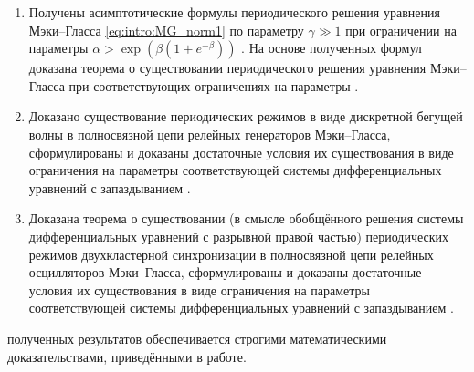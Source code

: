 \bigskip

{}
\begin{enumerate}[beginpenalty=10000] %
	\item Получены асимптотические формулы периодического решения уравнения Мэки--Гласса \eqref{eq:intro:MG_norm1} по параметру $\gamma \gg 1$ при ограничении на параметры $\alpha > \exp\left(\beta(1 + e^{-\beta})\right)$ \cite[Теорема 5.6]{wosbib1}. На основе полученных формул доказана теорема о существовании периодического решения уравнения Мэки--Гласса при соответствующих ограничениях на параметры \cite[Теорема 3.2]{wosbib1}.
	\item Доказано существование периодических режимов в виде дискретной бегущей волны в полносвязной цепи релейных генераторов Мэки--Гласса, сформулированы и доказаны достаточные условия их существования в виде ограничения на параметры соответствующей системы дифференциальных уравнений с запаздыванием \cite[Теорема 16]{wosbib2}.
	\item Доказана теорема о существовании (в смысле обобщённого решения системы дифференциальных уравнений с разрывной правой частью) периодических режимов двухкластерной синхронизации в полносвязной цепи релейных осцилляторов Мэки--Гласса, сформулированы и доказаны достаточные условия их существования в виде ограничения на параметры соответствующей системы дифференциальных уравнений с запаздыванием \cite[Теорема 5.2]{scbib1}.
\end{enumerate}


\bigskip

{\reliability} полученных результатов обеспечивается строгими математическими доказательствами, приведёнными в работе. %

\nocite{scbib1, wosbib1, wosbib2}

\bigskip

